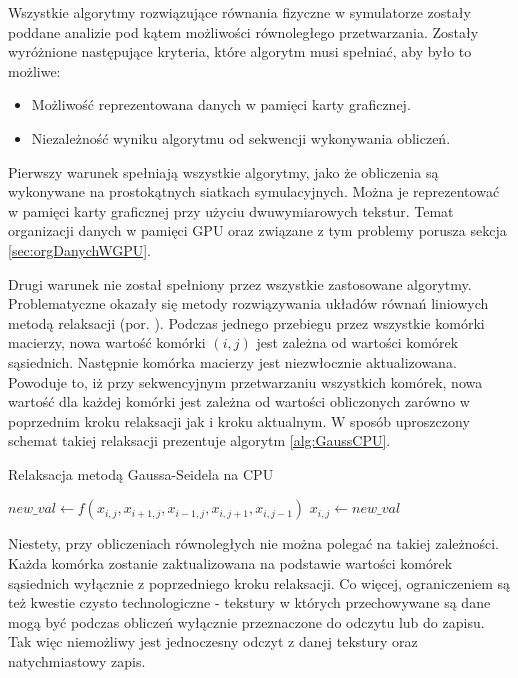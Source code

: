Wszystkie algorytmy rozwiązujące równania fizyczne w symulatorze 
zostały poddane analizie pod kątem możliwości równoległego przetwarzania.
Zostały wyróżnione następujące kryteria, które algorytm musi spełniać, aby było
to możliwe:

\begin{itemize}

\item Możliwość reprezentowana danych w pamięci karty graficznej.

\item Niezależność wyniku algorytmu od sekwencji wykonywania obliczeń.

\end{itemize}

Pierwszy warunek spełniają wszystkie algorytmy, jako że obliczenia są wykonywane
na prostokątnych siatkach symulacyjnych. Można je reprezentować w pamięci karty
graficznej przy użyciu dwuwymiarowych tekstur. Temat organizacji danych w
pamięci GPU oraz związane z tym problemy porusza sekcja \ref{sec:orgDanychWGPU}.

Drugi warunek nie został spełniony przez wszystkie zastosowane algorytmy.
Problematyczne okazały się metody rozwiązywania układów równań liniowych metodą
relaksacji  (por. \cite{GaussSeidel}). Podczas jednego
przebiegu przez wszystkie komórki macierzy, nowa wartość komórki $(i, j)$ jest
zależna od wartości komórek sąsiednich. Następnie komórka macierzy jest
niezwłocznie aktualizowana. Powoduje to, iż przy sekwencyjnym przetwarzaniu
wszystkich komórek, nowa wartość dla każdej komórki jest zależna od wartości
obliczonych zarówno w poprzednim kroku relaksacji jak i kroku aktualnym. W
sposób uproszczony schemat takiej relaksacji prezentuje algorytm
\ref{alg:GaussCPU}.

\begin{algorithm}[H]
  \caption{Relaksacja metodą Gaussa-Seidela na CPU}
  \label{alg:GaussCPU}
\begin{algorithmic}
    \State $new\_val\gets f(x_{i,j}, x_{i+1,j}, x_{i-1,j}, x_{i,j+1}, x_{i,j-1})$
    \State $x_{i,j}\gets new\_val$
  \EndFor
\EndFor
\end{algorithmic}
\end{algorithm}

Niestety, przy obliczeniach równoległych nie można polegać na takiej zależności.
Każda komórka zostanie zaktualizowana na podstawie wartości komórek sąsiednich
wyłącznie z poprzedniego kroku relaksacji. Co więcej, ograniczeniem są też
kwestie czysto technologiczne - tekstury w których przechowywane są dane mogą
być podczas obliczeń wyłącznie przeznaczone do odczytu lub do zapisu. Tak więc
niemożliwy jest jednoczesny odczyt z danej tekstury oraz natychmiastowy zapis.

